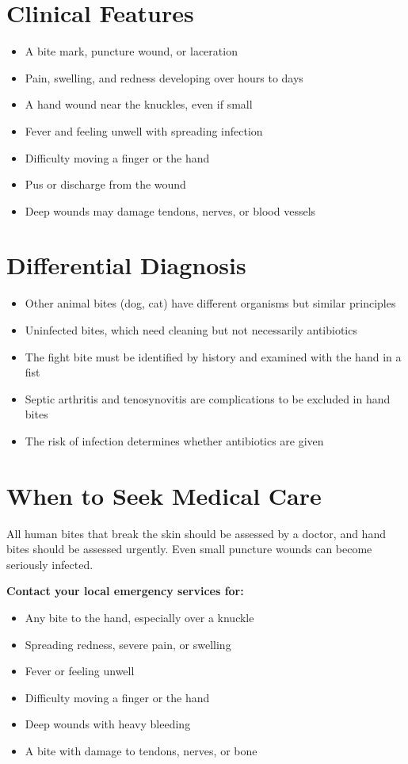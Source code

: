 \section*{Clinical Features}
\begin{itemize}
    \item A bite mark, puncture wound, or laceration
    \item Pain, swelling, and redness developing over hours to days
    \item A hand wound near the knuckles, even if small
    \item Fever and feeling unwell with spreading infection
    \item Difficulty moving a finger or the hand
    \item Pus or discharge from the wound
    \item Deep wounds may damage tendons, nerves, or blood vessels
\end{itemize}

\section*{Differential Diagnosis}
\begin{itemize}
    \item Other animal bites (dog, cat) have different organisms but similar principles
    \item Uninfected bites, which need cleaning but not necessarily antibiotics
    \item The fight bite must be identified by history and examined with the hand in a fist
    \item Septic arthritis and tenosynovitis are complications to be excluded in hand bites
    \item The risk of infection determines whether antibiotics are given
\end{itemize}

\section*{When to Seek Medical Care}
All human bites that break the skin should be assessed by a doctor, and hand bites should be assessed urgently. Even small puncture wounds can become seriously infected.

\textbf{Contact your local emergency services for:}
\begin{itemize}
    \item Any bite to the hand, especially over a knuckle
    \item Spreading redness, severe pain, or swelling
    \item Fever or feeling unwell
    \item Difficulty moving a finger or the hand
    \item Deep wounds with heavy bleeding
    \item A bite with damage to tendons, nerves, or bone
\end{itemize}

